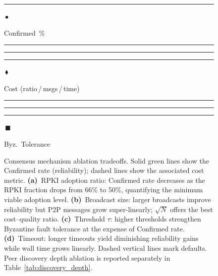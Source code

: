 \documentclass[conference]{IEEEtran}
\begin{document}
\begin{figure}[t]

\vspace{2mm}
{\scriptsize
\textcolor{cGreen}{\rule{8pt}{2pt}\,$\bullet$} Confirmed~\%
\qquad
\textcolor{cOrange}{\rule[1pt]{4pt}{0.5pt}\rule[1pt]{2pt}{0pt}\rule[1pt]{4pt}{0.5pt}\,$\blacklozenge$} Cost (ratio\,/\,msgs\,/\,time)
\qquad
\textcolor{cBlue}{\rule[1pt]{4pt}{0.5pt}\rule[1pt]{2pt}{0pt}\rule[1pt]{4pt}{0.5pt}\,$\blacksquare$} Byz.\ Tolerance
}
\caption{Consensus mechanism ablation tradeoffs. Solid green lines show the Confirmed rate (reliability); dashed lines show the associated cost metric. \textbf{(a)}~RPKI adoption ratio: Confirmed rate decreases as the RPKI fraction drops from 66\% to 50\%, quantifying the minimum viable adoption level. \textbf{(b)}~Broadcast size: larger broadcasts improve reliability but P2P messages grow super-linearly; $\sqrt{N}$ offers the best cost--quality ratio. \textbf{(c)}~Threshold $\tau$: higher thresholds strengthen Byzantine fault tolerance at the expense of Confirmed rate. \textbf{(d)}~Timeout: longer timeouts yield diminishing reliability gains while wall time grows linearly. Dashed vertical lines mark defaults. Peer discovery depth ablation is reported separately in Table~\ref{tab:discovery_depth}.}
\label{fig:consensus_ablation}
\end{figure}
\end{document}
